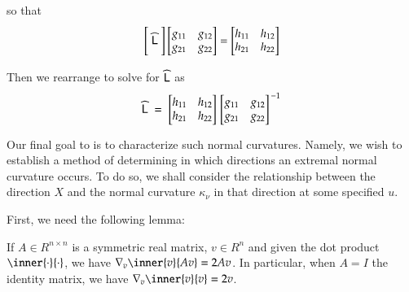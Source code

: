 		so that
		\begin{equation}
		\Bigg[ \;\widehat{\mathsf{L}}\; \Bigg]
		\begin{bmatrix} g_{11} & g_{12} \\ g_{21} & g_{22} \end{bmatrix}
		= \begin{bmatrix} h_{11} & h_{12} \\ h_{21} & h_{22} \end{bmatrix}
		\end{equation}
		
		Then we rearrange to solve for $\widehat{\mathsf{L}}$ as
			\begin{equation}
			\widehat{\mathsf{L}}
			\;=\; \begin{bmatrix} h_{11} & h_{12} \\ h_{21} & h_{22} \end{bmatrix}
			\left.\begin{bmatrix} g_{11} & g_{12} \\ g_{21} & g_{22} \end{bmatrix}\right.^{-1}
			\end{equation}
		
		Our final goal to is to characterize such normal curvatures.
		Namely, we wish to establish a method of determining in which directions an extremal
		normal curvature occurs.
		To do so, we shall consider the relationship between the direction $X$ and the normal curvature $\kappa_\nu$ in that direction at some specified $u$.

	
		
		First, we need the following lemma:
        \begin{lemma}
            If $A\in R^{n\times n}$ is a symmetric real matrix, $v \in R^n$
            and given the dot product $\inner{\cdot}{\cdot}$,
            we have $\nabla_{v} \inner{v}{Av} = 2Av$.
            In particular, when $A = I$ the identity matrix, we have
            $ \nabla_{v} \inner{v}{v} = 2v$.
        \end{lemma}
        
